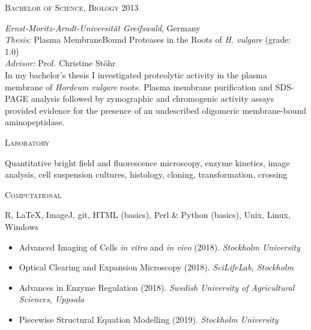 \documentclass[11pt]{article}
\begin{document}
\textsc{\large{Bachelor of Science, Biology} \hfill \textsc{2013}}
\begin{addmargin}[24pt]{0pt}
	\textit{Ernst-Moritz-Arndt-Universität Greifswald}, Germany \\
	\textit{Thesis:} Plasma Membrane\textendash Bound Proteases in the Roots of \textit{H. vulgare} (grade: \textsc{1.0}) \\
	\textit{Advisor:} Prof. Christine Stöhr
	\vspace{0.1cm} \\
	\small{In my bachelor's thesis I investigated proteolytic activity in the plasma membrane of \textit{Hordeum vulgare} roots. Plasma membrane purification and SDS-PAGE analysis followed by zymographic and chromogenic activity assays provided evidence for the presence of an undescribed oligomeric membrane-bound aminopeptidase.}
\end{addmargin}
\vspace{0.5cm}


\textsc{\large{Laboratory}} 
\begin{addmargin}[24pt]{0pt}
	Quantitative bright field and fluorescence microscopy, enzyme kinetics, image analysis, cell suspension cultures, histology, cloning, transformation, crossing
\end{addmargin}
\vspace{0.2cm}

\textsc{\large{Computational}} 
\begin{addmargin}[24pt]{0pt}
	R, LaTeX, ImageJ, git, HTML (basics), Perl \& Python (basics), Unix, Linux, Windows
\end{addmargin}	
\vspace{0.5cm}

\vspace{-0.175cm}
\begin{itemize}[label={},itemindent=-9pt,leftmargin=24pt]
	\itemsep-0.1cm
	\item Advanced Imaging of Cells \textit{in vitro} and \textit{in vivo} (2018). \textit{Stockholm University} 
	\item Optical Clearing and Expansion Microscopy (2018). \textit{SciLifeLab, Stockholm} 	
	\item Advances in Enzyme Regulation (2018). \textit{Swedish University of Agricultural Sciences, Uppsala} 
	\item Piecewise Structural Equation Modelling (2019). \textit{Stockholm University}
\end{itemize}
\vspace{0.3cm}
\end{document}
